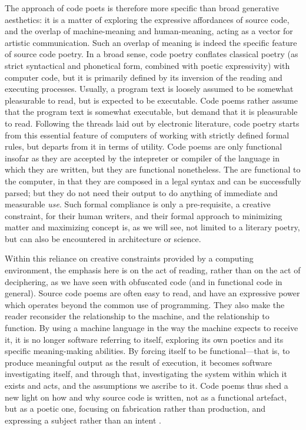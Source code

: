 The approach of code poets is therefore more specific than broad generative aesthetics: it is a matter of exploring the expressive affordances of source code, and the overlap of machine-meaning and human-meaning, acting as a vector for artistic communication. Such an overlap of meaning is indeed the specific feature of source code poetry. In a broad sense, code poetry conflates classical poetry (as strict syntactical and phonetical form, combined with poetic expressivity) with computer code, but it is primarily defined by its inversion of the reading and executing processes. Usually, a program text is loosely assumed to be somewhat pleasurable to read, but is expected to be executable. Code poems rather assume that the program text is somewhat executable, but demand that it is pleasurable to read. Following the threads laid out by electronic literature, code poetry starts from this essential feature of computers of working with strictly defined formal rules, but departs from it in terms of utility. Code poems are only functional insofar as they are accepted by the intepreter or compiler of the language in which they are written, but they are functional nonetheless. The are functional to the computer, in that they are composed in a legal syntax and can be successfully parsed; but they do not need their output to do anything of immediate and measurable \emph{use}. Such formal compliance is only a pre-requisite, a creative constraint, for their human writers, and their formal approach to minimizing matter and maximizing concept is, as we will see, not limited to a literary poetry, but can also be encountered in architecture or science.

Within this reliance on creative constraints provided by a computing environment, the emphasis here is on the act of reading, rather than on the act of deciphering, as we have seen with obfuscated code (and in functional code in general). Source code poems are often easy to read, and have an expressive power which operates beyond the common use of programming. They also make the reader reconsider the relationship to the machine, and the relationship to function. By using a machine language in the way the machine expects to receive it, it is no longer software referring to itself, exploring its own poetics and its specific meaning-making abilities. By forcing itself to be functional—that is, to produce meaningful output as the result of execution, it becomes software investigating itself, and through that, investigating the system within which it exists and acts, and the assumptions we ascribe to it. Code poems thus shed a new light on how and why source code is written, not as a functional artefact, but as a poetic one, focusing on fabrication rather than production, and expressing a subject rather than an intent \citep{paloque-berges_poetique_2009}.

